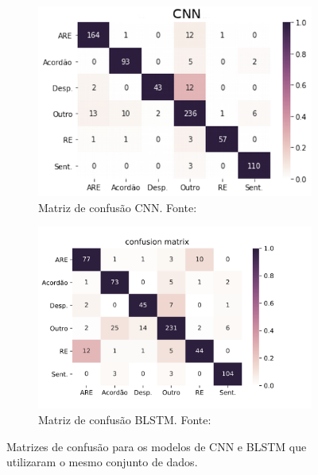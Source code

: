 \begin{figure}[ht]
    \centering
    \begin{subfigure}[b]{0.4\textwidth}
        \includegraphics[width=\textwidth]{figuras/matrizSilva}
        \caption{Matriz de confusão CNN. Fonte: \cite[p. 3]{da_silva_document_2018}}
        \label{fig:matrizSilva}
    \end{subfigure}\hfill
    \begin{subfigure}[b]{0.45\textwidth}
        \includegraphics[width=\textwidth]{figuras/matrizBraz}
        \caption{Matriz de confusão BLSTM. Fonte: \cite[p. 3]{braz_document_2018}}
        \label{fig:matrizBraz}
    \end{subfigure}
    \caption[Matriz de confusão dos modelos CNN e BLSTM]{Matrizes de confusão para os modelos de CNN e BLSTM que utilizaram o mesmo conjunto de dados.}
\end{figure}

